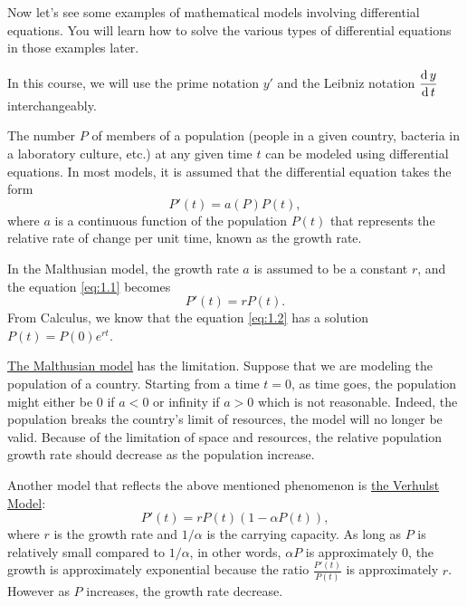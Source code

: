 Now let's see some examples of mathematical models involving differential equations. You will learn how to solve the various types of differential equations in those examples later.

In this course, we will use the prime notation $y'$ and the Leibniz notation $\dfrac{\operatorname{d} y}{\operatorname{d} t}$ interchangeably.

\begin{example}
  The number $P$ of members of a population (people in a given country, bacteria in a laboratory culture, etc.) at any given time $t$ can be modeled using differential equations. In most models, it is assumed that the differential equation takes the form
  \begin{equation}
    P'(t) = a(P)P(t),
    \label{eq:1.1}
  \end{equation}
  where $a$ is a continuous function of the population $P(t)$ that represents the relative rate of change per unit time, known as the growth rate.

  In the Malthusian model, the growth rate $a$ is assumed to be a constant $r$, and the equation \ref{eq:1.1} becomes
  \begin{equation}
    P'(t) = rP(t).
    \label{eq:1.2}
  \end{equation}
  From Calculus, we know that the equation \ref{eq:1.2} has a solution $P(t)=P(0)e^{rt}$.

  \href{https://en.wikipedia.org/wiki/Malthusian_growth_model}{The Malthusian model} has the limitation. Suppose that we are modeling the population of a country. Starting from a time $t=0$, as time goes, the population might either be 0 if $a<0$ or infinity if $a>0$ which is not reasonable. Indeed, the population breaks the country's limit of resources, the model will no longer be valid. Because of the limitation of space and resources, the relative population growth rate should decrease as the population increase.

  Another model that reflects the above mentioned phenomenon is \href{https://en.wikipedia.org/wiki/Logistic_function#In_ecology:_modeling_population_growth}{the Verhulst Model}:
  \begin{equation}
    P'(t)=rP(t)(1-\alpha P(t)),
    \label{eq:1.3}
  \end{equation}
  where $r$ is the growth rate and $1/\alpha$ is the carrying capacity. As long as $P$ is relatively small compared to $1/\alpha$, in other words, $\alpha P$ is approximately 0, the growth is approximately exponential because the ratio $\frac{P'(t)}{P(t)}$ is approximately $r$. However as $P$ increases, the growth rate decrease.


\end{example}
